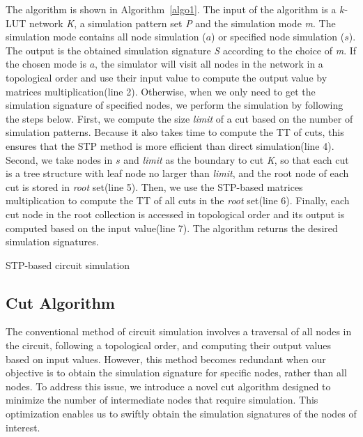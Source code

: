 \documentclass[conference]{IEEEtran}
\begin{document}
The algorithm is shown in Algorithm~\ref{algo1}.
The input of the algorithm is a $k$-LUT network \emph{K}, a simulation pattern set \emph{P} and the simulation mode \emph{m}.
The simulation mode contains all node simulation ($a$) or specified node simulation ($s$).
The output is the obtained simulation signature \emph{S} according to the choice of \emph{m}.
If the chosen mode is $a$, the simulator will visit all nodes in the network in a topological order and use their input value to compute the output value by matrices multiplication(line 2).
Otherwise, when we only need to get the simulation signature of specified nodes, we perform the simulation by following the steps below.
First, we compute the size \emph{limit} of a cut based on the number of simulation patterns.
Because it also takes time to compute the TT of cuts, this ensures that the STP method is more efficient than direct simulation(line 4).
Second, we take nodes in $s$ and \emph{limit} as the boundary to cut \emph{K}, so that each cut is a tree structure with leaf node no larger than \emph{limit}, and the root node of each cut is stored in \emph{root} set(line 5).
Then, we use the STP-based matrices multiplication to compute the TT of all cuts in the \emph{root} set(line 6).
Finally, each cut node in the root collection is accessed in topological order and its output is computed based on the input value(line 7).
The algorithm returns the desired simulation signatures.

\begin{algorithm}[t]
  \SetAlgoLined
  \LinesNumbered %
  \caption{STP-based circuit simulation}
  \label{algo1}
\end{algorithm}

\subsection{Cut Algorithm}
\label{sec33}
The conventional method of circuit simulation involves a traversal of all nodes in the circuit, following a topological order, and computing their output values based on input values. 
However, this method becomes redundant when our objective is to obtain the simulation signature for specific nodes, rather than all nodes.
To address this issue, we introduce a novel cut algorithm designed to minimize the number of intermediate nodes that require simulation. 
This optimization enables us to swiftly obtain the simulation signatures of the nodes of interest.
\end{document}
